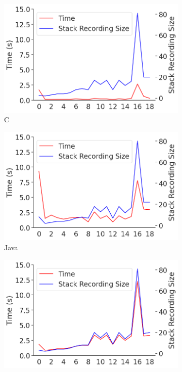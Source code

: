 \documentclass[english,submission]{programming}
\begin{document}
\begin{figure}[htbp]
  \centering
  \begin{subfigure}[b]{0.45\textwidth}
      \centering
      \includegraphics[width=\textwidth]{img/scenario_bs_c.png}
      \caption{\centering C}
      \label{subfig:scenario-bs-c}
  \end{subfigure}
  \hfill
  \begin{subfigure}[b]{0.45\textwidth}
      \centering
      \includegraphics[width=\textwidth]{img/scenario_bs_java.png}
      \caption{\centering Java}
      \label{subfig:scenario-bs-java}
  \end{subfigure}
  \begin{subfigure}[b]{0.45\textwidth}
    \centering
    \includegraphics[width=\textwidth]{img/scenario_bs_python.png}

\end{subfigure}
\end{figure}
\end{document}
